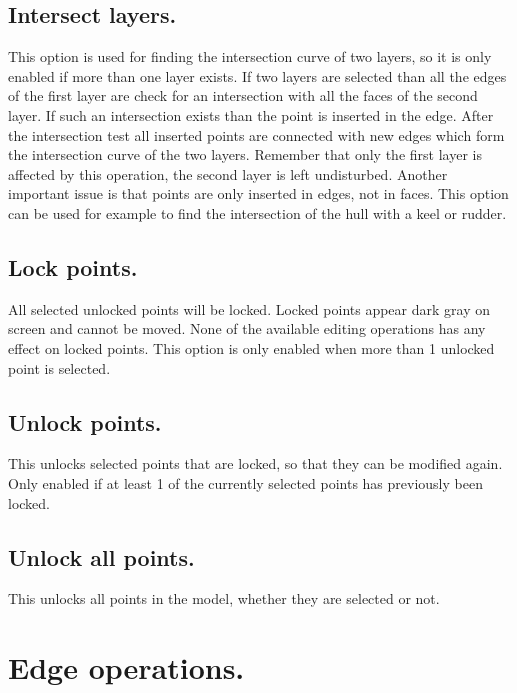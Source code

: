 \documentclass[12pt]{article}
\begin{document}
\subsection{Intersect layers.}
This option is used for finding the intersection curve of two layers, so it is only enabled if more than
one layer exists. If two layers are selected than all the edges of the first layer are check for an
intersection with all the faces of the second layer. If such an intersection exists than the point is
inserted in the edge. After the intersection test all inserted points are connected with new edges
which form the intersection curve of the two layers. Remember that only the first layer is affected by
this operation, the second layer is left undisturbed. Another important issue is that points are only
inserted in edges, not in faces. This option can be used for example to find the intersection of the
hull with a keel or rudder.

\subsection{Lock points.}
All selected unlocked points will be locked. Locked points appear dark gray on screen and cannot
be moved. None of the available editing operations has any effect on locked points. This option is
only enabled when more than 1 unlocked point is selected.

\subsection{Unlock points.}
This unlocks selected points that are locked, so that they can be modified again. Only enabled if at
least 1 of the currently selected points has previously been locked.

\subsection{Unlock all points.}
This unlocks all points in the model, whether they are selected or not.

\section{Edge operations.}
\end{document}
